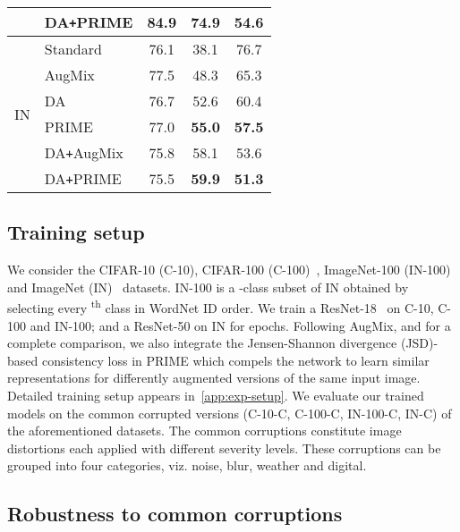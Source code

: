 \documentclass[runningheads]{llncs}
\begin{document}
\begin{table}[t]
\begin{tabular}{clccc}
        & DA\texttt{+}PRIME & 84.9 & \textbf{74.9} & \textbf{54.6}\\
        \midrule
        \multirow{7}{*}{IN} & Standard & 76.1 & 38.1 & 76.7\\
        & AugMix & 77.5 & 48.3 & 65.3 \\
        & DA & 76.7 & 52.6 & 60.4 \\
        & PRIME & 77.0 & \textbf{55.0} & \textbf{57.5}\\
\cmidrule{2-5}
        & DA\texttt{+}AugMix & 75.8 & 58.1 & 53.6\\
        & DA\texttt{+}PRIME & 75.5 & \textbf{59.9} & \textbf{51.3}\\
\bottomrule
    \end{tabular}
    \vspace*{-2mm}
    \label{tab:results-main}
\end{table}

\subsection{Training setup}
\label{subsec:training_setup}

We consider the CIFAR-10 (C-10), CIFAR-100 (C-100)~\cite{cifar102009}, ImageNet-100 (IN-100) and ImageNet (IN)~\cite{imagenet2009} datasets. IN-100 is a -class subset of IN obtained by selecting every \textsuperscript{th} class in WordNet ID order. We train a ResNet-18~\cite{resnet2016} on C-10, C-100 and IN-100; and a ResNet-50 on IN for  epochs. Following AugMix, and for a complete comparison, we also integrate the Jensen-Shannon divergence (JSD)-based consistency loss in PRIME which compels the network to learn similar representations for differently augmented versions of the same input image. Detailed training setup appears in~\cref{app:exp-setup}. We evaluate our trained models on the common corrupted versions (C-10-C, C-100-C, IN-100-C, IN-C) of the aforementioned datasets. The common corruptions \cite{corruptions2019} constitute  image distortions each applied with  different severity levels. These corruptions can be grouped into four categories, viz. noise, blur, weather and digital.

\subsection{Robustness to common corruptions}
\label{subsec:performance_results}
\end{document}
